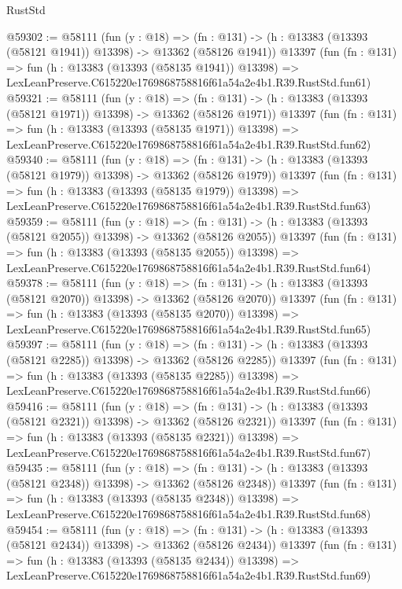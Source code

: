\begin{lexlean}{RustStd}
\begin{coremodule}
@59302 := @58111
    (fun (y : @18) =>
    (fn : @131) -> (h : @13383 (@13393 (@58121 @1941)) @13398) -> @13362 (@58126 @1941))
    @13397
    (fun (fn : @131) =>
    fun (h : @13383 (@13393 (@58135 @1941)) @13398) =>
    LexLeanPreserve.C615220e1769868758816f61a54a2e4b1.R39.RustStd.fun61)
@59321 := @58111
    (fun (y : @18) =>
    (fn : @131) -> (h : @13383 (@13393 (@58121 @1971)) @13398) -> @13362 (@58126 @1971))
    @13397
    (fun (fn : @131) =>
    fun (h : @13383 (@13393 (@58135 @1971)) @13398) =>
    LexLeanPreserve.C615220e1769868758816f61a54a2e4b1.R39.RustStd.fun62)
@59340 := @58111
    (fun (y : @18) =>
    (fn : @131) -> (h : @13383 (@13393 (@58121 @1979)) @13398) -> @13362 (@58126 @1979))
    @13397
    (fun (fn : @131) =>
    fun (h : @13383 (@13393 (@58135 @1979)) @13398) =>
    LexLeanPreserve.C615220e1769868758816f61a54a2e4b1.R39.RustStd.fun63)
@59359 := @58111
    (fun (y : @18) =>
    (fn : @131) -> (h : @13383 (@13393 (@58121 @2055)) @13398) -> @13362 (@58126 @2055))
    @13397
    (fun (fn : @131) =>
    fun (h : @13383 (@13393 (@58135 @2055)) @13398) =>
    LexLeanPreserve.C615220e1769868758816f61a54a2e4b1.R39.RustStd.fun64)
@59378 := @58111
    (fun (y : @18) =>
    (fn : @131) -> (h : @13383 (@13393 (@58121 @2070)) @13398) -> @13362 (@58126 @2070))
    @13397
    (fun (fn : @131) =>
    fun (h : @13383 (@13393 (@58135 @2070)) @13398) =>
    LexLeanPreserve.C615220e1769868758816f61a54a2e4b1.R39.RustStd.fun65)
@59397 := @58111
    (fun (y : @18) =>
    (fn : @131) -> (h : @13383 (@13393 (@58121 @2285)) @13398) -> @13362 (@58126 @2285))
    @13397
    (fun (fn : @131) =>
    fun (h : @13383 (@13393 (@58135 @2285)) @13398) =>
    LexLeanPreserve.C615220e1769868758816f61a54a2e4b1.R39.RustStd.fun66)
@59416 := @58111
    (fun (y : @18) =>
    (fn : @131) -> (h : @13383 (@13393 (@58121 @2321)) @13398) -> @13362 (@58126 @2321))
    @13397
    (fun (fn : @131) =>
    fun (h : @13383 (@13393 (@58135 @2321)) @13398) =>
    LexLeanPreserve.C615220e1769868758816f61a54a2e4b1.R39.RustStd.fun67)
@59435 := @58111
    (fun (y : @18) =>
    (fn : @131) -> (h : @13383 (@13393 (@58121 @2348)) @13398) -> @13362 (@58126 @2348))
    @13397
    (fun (fn : @131) =>
    fun (h : @13383 (@13393 (@58135 @2348)) @13398) =>
    LexLeanPreserve.C615220e1769868758816f61a54a2e4b1.R39.RustStd.fun68)
@59454 := @58111
    (fun (y : @18) =>
    (fn : @131) -> (h : @13383 (@13393 (@58121 @2434)) @13398) -> @13362 (@58126 @2434))
    @13397
    (fun (fn : @131) =>
    fun (h : @13383 (@13393 (@58135 @2434)) @13398) =>
    LexLeanPreserve.C615220e1769868758816f61a54a2e4b1.R39.RustStd.fun69)

\end{coremodule}
\end{lexlean}
